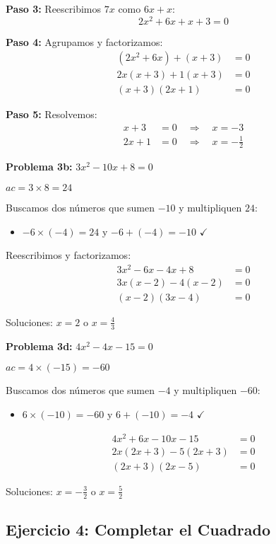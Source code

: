 \textbf{Paso 3:} Reescribimos $7x$ como $6x + x$:
$$2x^2 + 6x + x + 3 = 0$$

\textbf{Paso 4:} Agrupamos y factorizamos:
\begin{align}
(2x^2 + 6x) + (x + 3) &= 0\\
2x(x + 3) + 1(x + 3) &= 0\\
(x + 3)(2x + 1) &= 0
\end{align}

\textbf{Paso 5:} Resolvemos:
\begin{align}
x + 3 &= 0 \quad \Rightarrow \quad x = -3\\
2x + 1 &= 0 \quad \Rightarrow \quad x = -\frac{1}{2}
\end{align}

\textbf{Problema 3b:} $3x^2 - 10x + 8 = 0$

$ac = 3 \times 8 = 24$

Buscamos dos números que sumen $-10$ y multipliquen $24$:
\begin{itemize}
\item $-6 \times (-4) = 24$ y $-6 + (-4) = -10$ $\checkmark$
\end{itemize}

Reescribimos y factorizamos:
\begin{align}
3x^2 - 6x - 4x + 8 &= 0\\
3x(x - 2) - 4(x - 2) &= 0\\
(x - 2)(3x - 4) &= 0
\end{align}

Soluciones: $x = 2$ o $x = \frac{4}{3}$

\textbf{Problema 3d:} $4x^2 - 4x - 15 = 0$

$ac = 4 \times (-15) = -60$

Buscamos dos números que sumen $-4$ y multipliquen $-60$:
\begin{itemize}
\item $6 \times (-10) = -60$ y $6 + (-10) = -4$ $\checkmark$
\end{itemize}

\begin{align}
4x^2 + 6x - 10x - 15 &= 0\\
2x(2x + 3) - 5(2x + 3) &= 0\\
(2x + 3)(2x - 5) &= 0
\end{align}

Soluciones: $x = -\frac{3}{2}$ o $x = \frac{5}{2}$


\subsection*{Ejercicio 4: Completar el Cuadrado}

